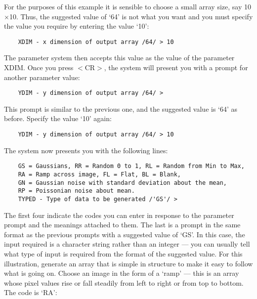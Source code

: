 For the purposes of this example it is sensible to choose a small array size,
say 10$\times$10.
Thus, the suggested value of `64' is not what you want and you must specify
the value you require by entering the value `10':

\begin{small}
\begin{verbatim}
    XDIM - x dimension of output array /64/ > 10
\end{verbatim}
\end{small}

The parameter system then accepts this value as the value of the parameter XDIM.
Once you press $<$CR$>$, the system will present you with a prompt for another
parameter value:

\begin{small}
\begin{verbatim}
    YDIM - y dimension of output array /64/ >
\end{verbatim}
\end{small}

This prompt is similar to the previous one, and the suggested value is `64' as
before.
Specify the value `10' again:

\begin{small}
\begin{verbatim}
    YDIM - y dimension of output array /64/ > 10
\end{verbatim}
\end{small}

The system now presents you with the following lines:

\begin{small}
\begin{verbatim}
    GS = Gaussians, RR = Random 0 to 1, RL = Random from Min to Max,
    RA = Ramp across image, FL = Flat, BL = Blank,
    GN = Gaussian noise with standard deviation about the mean,
    RP = Poissonian noise about mean.
    TYPED - Type of data to be generated /'GS'/ >
\end{verbatim}
\end{small}

The first four indicate the codes you can enter in response to the parameter
prompt and the meanings attached to them.
The last is a prompt in the same format as the previous prompts with a
suggested value of `GS'.
In this case, the input required is a character string rather than an integer
--- you can usually tell what type of input is required from the format of
the suggested value.
For this illustration, generate an array that is simple in structure to make
it easy to follow what is going on.
Choose an image in the form of a `ramp' --- this is an array whose
pixel values rise or fall steadily from left to right or from top to bottom.
The code is `RA':

